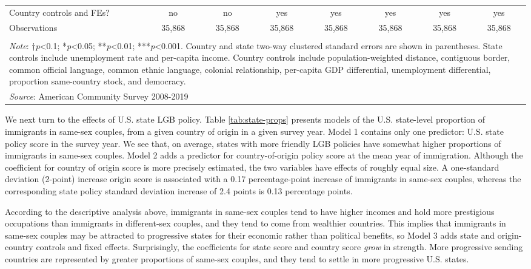 \documentclass[
  11pt,
]{article}
\begin{document}
\begin{table}[!htbp]
\begin{tabular}{@{\extracolsep{5pt}}lccccccc}
Country controls and FEs? & no & no & yes & yes & yes & yes & yes \\ 
Observations & 35,868 & 35,868 & 35,868 & 35,868 & 35,868 & 35,868 & 35,868 \\ 
\hline 
\hline \\[-1.8ex] 
\multicolumn{8}{l}{\parbox[t]{\textwidth}{\textit{Note}: †\textit{p}<0.1; *\textit{p}<0.05; **\textit{p}<0.01; ***\textit{p}<0.001. Country and state two-way clustered standard errors are shown in parentheses. State controls include unemployment rate and per-capita income. Country controls include population-weighted distance, contiguous border, common official language, common ethnic language, colonial relationship, per-capita GDP differential, unemployment differential, proportion same-country stock, and democracy.}} \\ 
\multicolumn{8}{l}{\textit{Source}: American Community Survey 2008-2019} \\ 
\end{tabular} 
\end{table}

We next turn to the effects of U.S. state LGB policy. Table \ref{tab:state-props} presents models of the U.S. state-level proportion of immigrants in same-sex couples, from a given country of origin in a given survey year. Model 1 contains only one predictor: U.S. state policy score in the survey year. We see that, on average, states with more friendly LGB policies have somewhat higher proportions of immigrants in same-sex couples. Model 2 adds a predictor for country-of-origin policy score at the mean year of immigration. Although the coefficient for country of origin score is more precisely estimated, the two variables have effects of roughly equal size. A one-standard deviation (2-point) increase origin score is associated with a 0.17 percentage-point increase of immigrants in same-sex couples, whereas the corresponding state policy standard deviation increase of 2.4 points is 0.13 percentage points.

According to the descriptive analysis above, immigrants in same-sex couples tend to have higher incomes and hold more prestigious occupations than immigrants in different-sex couples, and they tend to come from wealthier countries. This implies that immigrants in same-sex couples may be attracted to progressive states for their economic rather than political benefits, so Model 3 adds state and origin-country controls and fixed effects. Surprisingly, the coefficients for state score and country score \emph{grow} in strength. More progressive sending countries are represented by greater proportions of same-sex couples, and they tend to settle in more progressive U.S. states.
\end{document}
